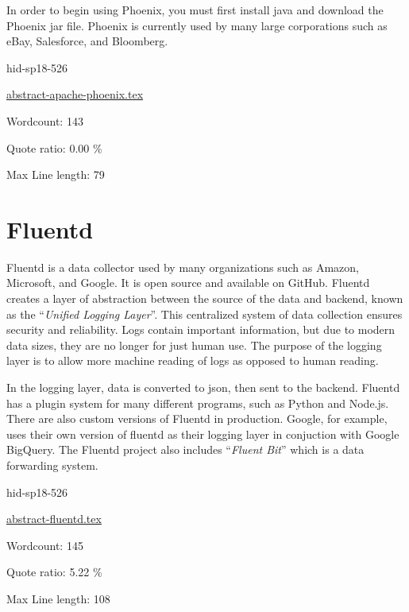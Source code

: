 In order to begin using Phoenix, you must first install java and download
the Phoenix jar file. Phoenix is currently used by many large corporations
such as eBay, Salesforce, and Bloomberg.



\begin{IU}

hid-sp18-526

\href{https://github.com/cloudmesh-community/hid-sp18-526/blob/master//technology/abstract-apache-phoenix.tex}{abstract-apache-phoenix.tex}

 

Wordcount: 143


Quote ratio: 0.00 \%
 
Max Line length: 79
\end{IU}

\section{Fluentd}

Fluentd is a data collector used by many organizations such as Amazon,
Microsoft, and Google\cite{hid-sp18-526-www-fluentd}. It is open source
and available on GitHub. Fluentd creates a layer of abstraction between the
source of the data and backend, known as the \color{blue}``\emph{Unified Logging Layer}''\color{black}. This
centralized system of data collection ensures security and reliability. Logs
contain important information, but due to modern data sizes, they are no
longer for just human use. The purpose of the logging layer is to allow more
machine reading of logs as opposed to human reading.

In the logging layer, data is converted to json, then sent to the
backend. Fluentd has a plugin system for many different programs,
such as Python and Node.js. There are also custom versions of Fluentd in
production. Google, for example, uses their own version of fluentd as their
logging layer in conjuction with Google BigQuery. The Fluentd project also
includes \color{blue}``\emph{Fluent Bit}''\color{black} which is a data forwarding system.



\begin{IU}

hid-sp18-526

\href{https://github.com/cloudmesh-community/hid-sp18-526/blob/master//technology/abstract-fluentd.tex}{abstract-fluentd.tex}

 

Wordcount: 145


Quote ratio: 5.22 \%
 
Max Line length: 108
\end{IU}


